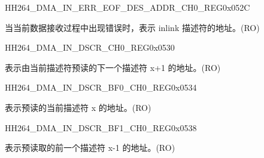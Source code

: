 \begin{register}{H}{H264\_DMA\_IN\_ERR\_EOF\_DES\_ADDR\_CH0\_REG}{0x052C}\label{regdesc:H264DMAINERREOFDESADDRCH0REG}
%
\regnewline%
\begin{regdesc}\begin{reglist}
\label{fielddesc:H264DMAINERREOFDESADDRCH0}\item [H264\_DMA\_IN\_ERR\_EOF\_DES\_ADDR\_CH0] 当当前数据接收过程中出现错误时，表示 inlink 描述符的地址。(RO)
\end{reglist}\end{regdesc}
\end{register}


\begin{register}{H}{H264\_DMA\_IN\_DSCR\_CH0\_REG}{0x0530}\label{regdesc:H264DMAINDSCRCH0REG}
%
\regnewline%
\begin{regdesc}\begin{reglist}
\label{fielddesc:H264DMAINLINKDSCRCH0}\item [H264\_DMA\_INLINK\_DSCR\_CH0] 表示由当前描述符预读的下一个描述符 x+1 的地址。(RO)
\end{reglist}\end{regdesc}
\end{register}


\begin{register}{H}{H264\_DMA\_IN\_DSCR\_BF0\_CH0\_REG}{0x0534}\label{regdesc:H264DMAINDSCRBF0CH0REG}
%
\regnewline%
\begin{regdesc}\begin{reglist}
\label{fielddesc:H264DMAINLINKDSCRBF0CH0}\item [H264\_DMA\_INLINK\_DSCR\_BF0\_CH0] 表示预读的当前描述符 x 的地址。(RO)
\end{reglist}\end{regdesc}
\end{register}


\begin{register}{H}{H264\_DMA\_IN\_DSCR\_BF1\_CH0\_REG}{0x0538}\label{regdesc:H264DMAINDSCRBF1CH0REG}
%
\regnewline%
\begin{regdesc}\begin{reglist}
\label{fielddesc:H264DMAINLINKDSCRBF1CH0}\item [H264\_DMA\_INLINK\_DSCR\_BF1\_CH0] 表示预读取的前一个描述符 x-1 的地址。(RO)
\end{reglist}\end{regdesc}
\end{register}

